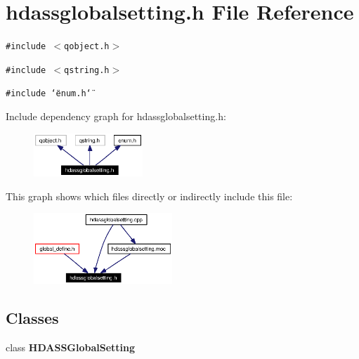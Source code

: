 \section{hdassglobalsetting.h File Reference}
\label{hdassglobalsetting_8h}


{\tt \#include $<$qobject.h$>$}\par
{\tt \#include $<$qstring.h$>$}\par
{\tt \#include \char`\"{}enum.h\char`\"{}}\par


Include dependency graph for hdassglobalsetting.h:\begin{figure}[H]
\begin{center}
\leavevmode
\includegraphics[width=116pt]{hdassglobalsetting_8h__incl}
\end{center}
\end{figure}


This graph shows which files directly or indirectly include this file:\begin{figure}[H]
\begin{center}
\leavevmode
\includegraphics[width=148pt]{hdassglobalsetting_8h__dep__incl}
\end{center}
\end{figure}
\subsection*{Classes}
\begin{CompactItemize}
\item 
class {\bf HDASSGlobal\-Setting}
\end{CompactItemize}
